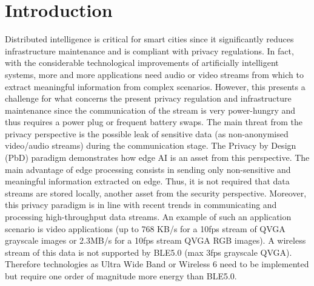 \section{Introduction}

Distributed intelligence is critical for smart cities since it significantly reduces infrastructure maintenance and is compliant with privacy regulations. In fact, with the considerable technological improvements of artificially intelligent systems, more and more applications need audio or video streams from which to extract meaningful information from complex scenarios. However, this presents a challenge for what concerns the present privacy regulation and infrastructure maintenance since the communication of the stream is very power-hungry and thus requires a power plug or frequent battery swaps.
The main threat from the privacy perspective is the possible leak of sensitive data (as non-anonymised video/audio streams) during the communication stage. The Privacy by Design (PbD) paradigm \cite{schaar2010privacy} demonstrates how edge AI is an asset from this perspective. The main advantage of edge processing consists in sending only non-sensitive and meaningful information extracted on edge. Thus, it is not required that data streams are stored locally,  another asset from the security perspective.
Moreover, this privacy paradigm is in line with recent trends in communicating and processing high-throughput data streams. An example of such an application scenario is video applications (up to 768 KB/s for a 10fps stream of QVGA grayscale images or 2.3MB/s for a 10fps stream QVGA RGB images). A wireless stream of this data is not supported by BLE5.0 (max 3fps grayscale QVGA). Therefore technologies as Ultra Wide Band or Wireless 6 need to be implemented but require one order of magnitude more energy than BLE5.0. 
